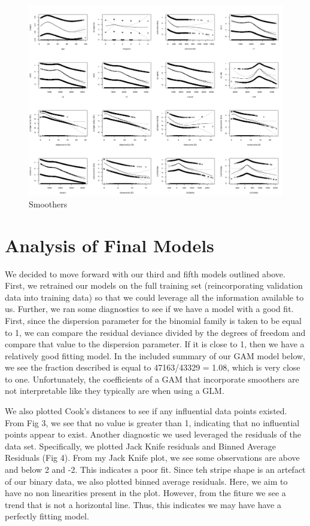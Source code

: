 \documentclass[11pt, oneside]{article}   	%
\begin{document}
  \begin{figure}[!ht]
    \centering
    \includegraphics[width=\textwidth]{smoothers.png}
    \caption{Smoothers}
  \end{figure}
  \FloatBarrier
\section*{Analysis of Final Models}
We decided to move forward with our third and fifth models outlined above. First, we retrained our models on the full training set (reincorporating validation data into training data) so that we could leverage all the information available to us. Further, we ran some diagnostics to see if we have a model with a good fit. First, since the dispersion parameter for the binomial family is taken to be equal to 1, we can compare the residual deviance divided by the degrees of freedom and compare that value to the dispersion parameter. If it is close to 1, then we have a relatively good fitting model. In the included summary of our GAM model below, we see the fraction described is equal to 47163/43329 = 1.08, which is very close to one. Unfortunately, the coefficients of a GAM that incorporate smoothers are not interpretable like they typically are when using a GLM. 

We also plotted Cook's distances to see if any influential data points existed. From Fig 3, we see that no value is greater than 1, indicating that no influential points appear to exist. Another diagnostic we used leveraged the residuals of the data set. Specifically, we plotted Jack Knife residuals and Binned Average Residuals (Fig 4). From my Jack Knife plot, we see some observations are above and below 2 and -2. This indicates a poor fit. Since teh stripe shape is an artefact of our binary data, we also plotted binned average residuals. Here, we aim to have no non linearities present in the plot. However, from the fiture we see a trend that is not a horizontal line. Thus, this indicates we may have have a perfectly fitting model. 
\end{document}

